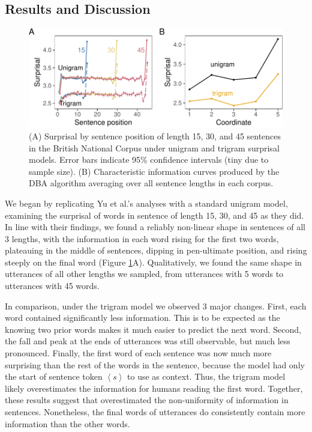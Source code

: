 \documentclass[entropy,article,submit,moreauthors,pdftex]{mdpi}
\begin{document}
\hypertarget{results-and-discussion}{%
\subsection{Results and Discussion}\label{results-and-discussion}}

\begin{figure}[tb]

{\centering \includegraphics{figs/bnc-plots-1} 

}

\caption{(A) Surprisal by sentence position of length 15, 30, and 45 sentences in the British National Corpus under unigram and trigram surprisal models. Error bars indicate 95\% confidence intervals (tiny due to sample size). (B) Characteristic information curves produced by the DBA algorithm averaging over all sentence lengths in each corpus.}\label{fig:bnc-plots}
\end{figure}

We began by replicating Yu et al.'s analyses with a standard unigram
model, examining the surprisal of words in sentence of length 15, 30,
and 45 as they did. In line with their findings, we found a reliably
non-linear shape in sentences of all 3 lengths, with the information in
each word rising for the first two words, plateauing in the middle of
sentences, dipping in pen-ultimate position, and rising steeply on the
final word (Figure \ref{fig:bnc-plots}A). Qualitatively, we found the
same shape in utterances of all other lengths we sampled, from
utterances with 5 words to utterances with 45 words.

In comparison, under the trigram model we observed 3 major changes.
First, each word contained significantly less information. This is to be
expected as the knowing two prior words makes it much easier to predict
the next word. Second, the fall and peak at the ends of utterances was
still observable, but much less pronounced. Finally, the first word of
each sentence was now much more surprising than the rest of the words in
the sentence, because the model had only the start of sentence token
\(\left<s\right>\) to use as context. Thus, the trigram model likely
overestimates the information for humans reading the first word.
Together, these results suggest that \citet{yu2016} overestimated the
non-uniformity of information in sentences. Nonetheless, the final words
of utterances do consistently contain more information than the other
words.
\end{document}
